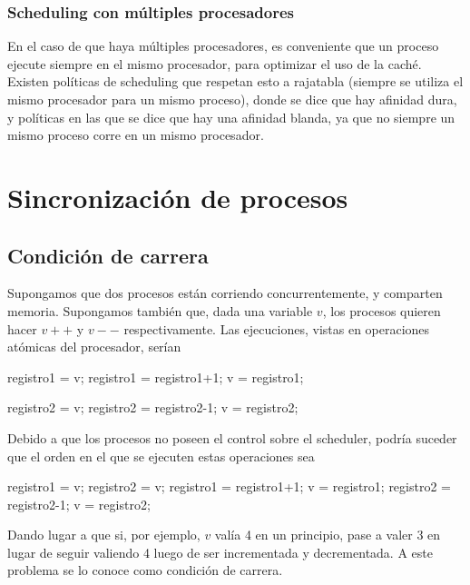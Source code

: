 \documentclass{article}
\begin{document}
\subsubsection{Scheduling con m\'ultiples procesadores}

En el caso de que haya m\'ultiples procesadores, es conveniente que un proceso ejecute siempre en el mismo procesador, para optimizar el uso de la cach\'e. Existen pol\'iticas de scheduling que respetan esto a rajatabla (siempre se utiliza el mismo procesador para un mismo proceso), donde se dice que hay afinidad dura, y pol\'iticas en las que se dice que hay una afinidad blanda, ya que no siempre un mismo proceso corre en un mismo procesador.

\section{Sincronizaci\'on de procesos}

\subsection{Condici\'on de carrera}

Supongamos que dos procesos est\'an corriendo concurrentemente, y comparten memoria. Supongamos tambi\'en que, dada una variable $v$, los procesos quieren hacer $v++$ y $v--$ respectivamente. Las ejecuciones, vistas en operaciones at\'omicas del procesador, ser\'ian

\begin{code}
registro1 = v;
registro1 = registro1+1;
v = registro1;
\end{code}

\begin{code}
registro2 = v;
registro2 = registro2-1;
v = registro2;
\end{code}

Debido a que los procesos no poseen el control sobre el scheduler, podr\'ia suceder que el orden en el que se ejecuten estas operaciones sea

\begin{code}
registro1 = v;
registro2 = v;
registro1 = registro1+1;
v = registro1;
registro2 = registro2-1;
v = registro2;
\end{code}

Dando lugar a que si, por ejemplo, $v$ val\'ia 4 en un principio, pase a valer 3 en lugar de seguir valiendo 4 luego de ser incrementada y decrementada. A este problema se lo conoce como condici\'on de carrera.
\end{document}
